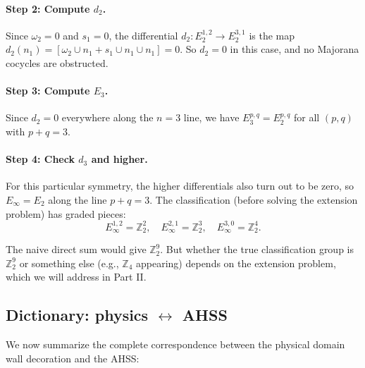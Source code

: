 \documentclass{SciPost}
\theoremstyle{definition}
\newcommand{\Zt}{\mathbb{Z}_2}
\newcommand{\Zn}[1]{\mathbb{Z}_{#1}}
\begin{document}
\paragraph{Step 2: Compute $d_2$.}
Since $\omega_2 = 0$ and $s_1 = 0$, the differential $d_2: E_2^{1,2} \to E_2^{3,1}$ is the map
$d_2(n_1) = [\omega_2 \cup n_1 + s_1 \cup n_1 \cup n_1] = 0.$
So $d_2 = 0$ in this case, and no Majorana cocycles are obstructed.

\paragraph{Step 3: Compute $E_3$.}
Since $d_2 = 0$ everywhere along the $n = 3$ line, we have $E_3^{p,q} = E_2^{p,q}$ for all $(p,q)$ with $p + q = 3$.

\paragraph{Step 4: Check $d_3$ and higher.}
For this particular symmetry, the higher differentials also turn out to be zero, so $E_\infty = E_2$ along the line $p + q = 3$.
The classification (before solving the extension problem) has graded pieces:
\begin{equation}
E_\infty^{1,2} = \Zt^2, \quad E_\infty^{2,1} = \Zt^3, \quad E_\infty^{3,0} = \Zt^4.
\end{equation}

The naive direct sum would give $\Zt^9$.
But whether the true classification group is $\Zt^9$ or something else (e.g., $\Zn{4}$ appearing) depends on the extension problem, which we will address in Part II.

\subsection{Dictionary: physics $\leftrightarrow$ AHSS}
\label{subsec:dictionary}

We now summarize the complete correspondence between the physical domain wall decoration and the AHSS:
\end{document}
